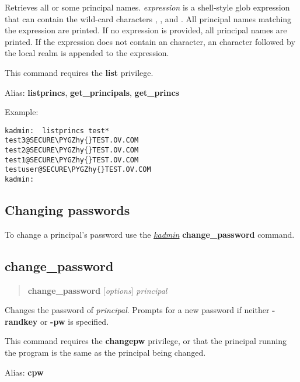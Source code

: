 \documentclass[letterpaper,10pt,english]{sphinxmanual}
\def\PYGZhy{\char`\-}
\begin{document}
Retrieves all or some principal names.  \emph{expression} is a shell-style
glob expression that can contain the wild-card characters ,
\code{*}, and \code{{[}{]}}.  All principal names matching the expression are
printed.  If no expression is provided, all principal names are
printed.  If the expression does not contain an  character, an
 character followed by the local realm is appended to the
expression.

This command requires the \textbf{list} privilege.

Alias: \textbf{listprincs}, \textbf{get\_principals}, \textbf{get\_princs}

Example:

\begin{Verbatim}[commandchars=\\\{\}]
kadmin:  listprincs test*
test3@SECURE\PYGZhy{}TEST.OV.COM
test2@SECURE\PYGZhy{}TEST.OV.COM
test1@SECURE\PYGZhy{}TEST.OV.COM
testuser@SECURE\PYGZhy{}TEST.OV.COM
kadmin:
\end{Verbatim}


\subsection{Changing passwords}
\label{admin/database:changing-passwords}
To change a principal's password use the {\hyperref[admin/admin_commands/kadmin_local:kadmin-1]{\emph{kadmin}}}
\textbf{change\_password} command.


\subsection{change\_password}
\label{admin/database:change-password}\begin{quote}

\textbf{change\_password} {[}\emph{options}{]} \emph{principal}
\end{quote}

Changes the password of \emph{principal}.  Prompts for a new password if
neither \textbf{-randkey} or \textbf{-pw} is specified.

This command requires the \textbf{changepw} privilege, or that the
principal running the program is the same as the principal being
changed.

Alias: \textbf{cpw}
\end{document}
